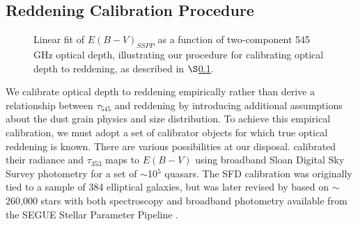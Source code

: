 \documentclass{emulateapj}
\begin{document}
\subsection{Reddening Calibration Procedure}
\label{sec:calib_ebv}

\begin{figure}
\begin{center}
\caption{\label{fig:calib} Linear fit of $E(B-V)_{SSPP}$ as a function of
two-component 545 GHz optical depth, illustrating our procedure for 
calibrating optical depth to reddening, as described in 
$\S$\ref{sec:calib_ebv}.}
\end{center}
\end{figure}

We calibrate optical depth to reddening empirically rather than derive a 
relationship between $\tau_{545}$ and reddening by introducing additional 
assumptions about the dust grain physics and size distribution. To achieve this
empirical calibration, we must adopt a set of calibrator objects for which true
optical reddening is known. There are various possibilities at our disposal. 
\cite{planckdust} calibrated their radiance and $\tau_{353}$ maps to $E(B-V)$ 
using broadband Sloan Digital Sky Survey \citep[SDSS;][]{sdss} photometry for a
set of $\sim$10$^5$ quasars. The SFD calibration was originally tied to a 
sample of 384 elliptical galaxies, but was later revised by 
\citet[hereafter SF11]{schlafly11} based on $\sim$260,000 stars with both 
spectroscopy and broadband photometry available from the SEGUE Stellar 
Parameter Pipeline \citep[SSPP,][]{sspp}.

\begin{figure*}
\begin{center}
\caption{\label{fig:resid} (top left) Residuals of $E(B-V)_{2comp}$ relative to
$E(B-V)_{SSPP}$ as a function of $E(B-V)_{SFD}$. The grayscale represents the 
conditional probability within each $E(B-V)_{SFD}$ bin. The central black line 
shows the moving median. The upper and lower black lines represent the moving 
75th and 25th percentiles respectively. (bottom left) Residuals of 
$E(B-V)_{2comp}$ relative to $E(B-V)_{SSPP}$ as a function of hot dust 
temperature $T_2$. (top right) Same as top left, but illustrating the residuals
of $E(B-V)_{mbb}$, our calibration of the \cite{planckdust} $\tau_{353}$ to 
$E(B-V)_{SSPP}$. (bottom right)  Same as bottom left, but showing the 
$E(B-V)_{mbb}$ residuals as a function of the single-MBB dust temperature from 
\cite{planckdust}. The temperature axes always range from the 0.4$^{th}$ 
percentile temperature value to the 99.6$^{th}$ percentile temperature value.}
\end{center}
\end{figure*}
\end{document}
